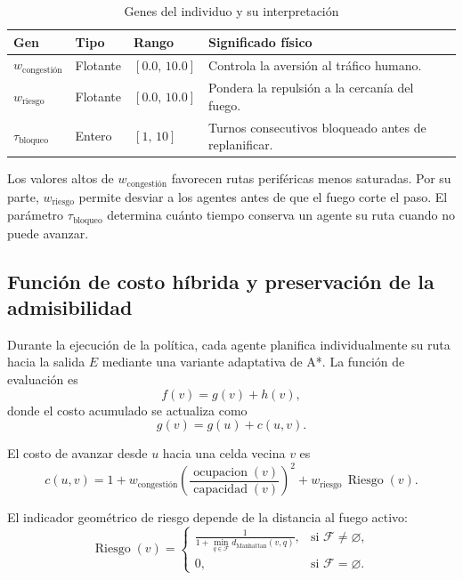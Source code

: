 \documentclass[11pt,letterpaper]{article}
\begin{document}
\begin{table}[htbp]
\centering
\caption{Genes del individuo y su interpretación}
\small
\begin{tabular}{@{}llll@{}}
\hline
\textbf{Gen} & \textbf{Tipo} & \textbf{Rango} & \textbf{Significado físico} \\
\hline
$w_{\text{congestión}}$
& Flotante
& $[0.0,\,10.0]$
& Controla la aversión al tráfico humano. \\

$w_{\text{riesgo}}$
& Flotante
& $[0.0,\,10.0]$
& Pondera la repulsión a la cercanía del fuego. \\

$\tau_{\text{bloqueo}}$
& Entero
& $[1,\,10]$
& Turnos consecutivos bloqueado antes de replanificar. \\
\hline
\end{tabular}
\end{table}

Los valores altos de $w_{\text{congestión}}$ favorecen rutas periféricas menos saturadas. Por su parte, $w_{\text{riesgo}}$ permite desviar a los agentes antes de que el fuego corte el paso. El parámetro $\tau_{\text{bloqueo}}$ determina cuánto tiempo conserva un agente su ruta cuando no puede avanzar.

\subsection{Función de costo híbrida y preservación de la admisibilidad}

Durante la ejecución de la política, cada agente planifica individualmente su ruta hacia la salida $E$ mediante una variante adaptativa de A*. La función de evaluación es
\[
f(v)=g(v)+h(v),
\]
donde el costo acumulado se actualiza como
\[
g(v)=g(u)+c(u,v).
\]

El costo de avanzar desde $u$ hacia una celda vecina $v$ es
\[
c(u,v)
=
1
+
w_{\text{congestión}}
\left(
\frac{\operatorname{ocupacion}(v)}
     {\operatorname{capacidad}(v)}
\right)^2
+
w_{\text{riesgo}}\,\operatorname{Riesgo}(v).
\]

El indicador geométrico de riesgo depende de la distancia al fuego activo:
\[
\operatorname{Riesgo}(v)=
\begin{cases}
\displaystyle
\frac{1}
{1+\min\limits_{q\in\mathcal{F}}
d_{\mathrm{Manhattan}}(v,q)},
& \text{si } \mathcal{F}\neq\varnothing,\\[8pt]
0,
& \text{si } \mathcal{F}=\varnothing.
\end{cases}
\]
\end{document}
